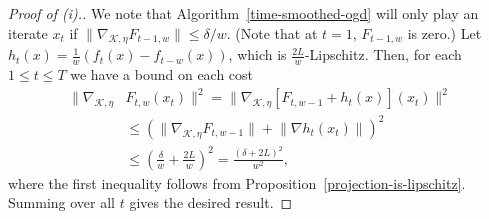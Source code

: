 \documentclass{article}
\def\norm#1{\mathopen\| #1 \mathclose\|}
\newcommand{\K}{\ensuremath{\mathcal K}}
\newcommand{\pa}[1]{\left(#1\right)}
\newcommand{\bra}[1]{\left[#1\right]}
\renewcommand{\K}{\mathcal{K}}
\begin{document}
\begin{proof}[Proof of (i).]
We note that Algorithm~\ref{time-smoothed-ogd} will only play an iterate $x_t$ if $\norm{\nabla_{\K,\eta} F_{t-1,w}} \leq \delta / w$. (Note that at $t=1$, $F_{t-1,w}$ is zero.) Let $h_t(x) = \frac{1}{w}\pa{ f_t(x) - f_{t-w}(x) }$, which is $\frac{2L}{w}$-Lipschitz. Then, for each $1 \leq t \leq T$ we have a bound on each cost
\begin{align*}
\norm{\nabla_{\K,\eta} &F_{t,w}(x_t)}^2
= \norm{\nabla_{\K,\eta} \bra{ F_{t,w-1} + h_t(x)}(x_t)}^2 \\
&\leq \pa{ \norm{\nabla_{\K,\eta} F_{t,w-1}} + \norm{\nabla h_t(x_t)} }^2 \\
&\leq \pa{ \frac{\delta}{w} + \frac{2L}{w} }^2 = \frac{(\delta + 2L)^2}{w^2},
\end{align*}
where the first inequality follows from Proposition~\ref{projection-is-lipschitz}. Summing over all $t$ gives the desired result.
\end{proof}
\end{document}
